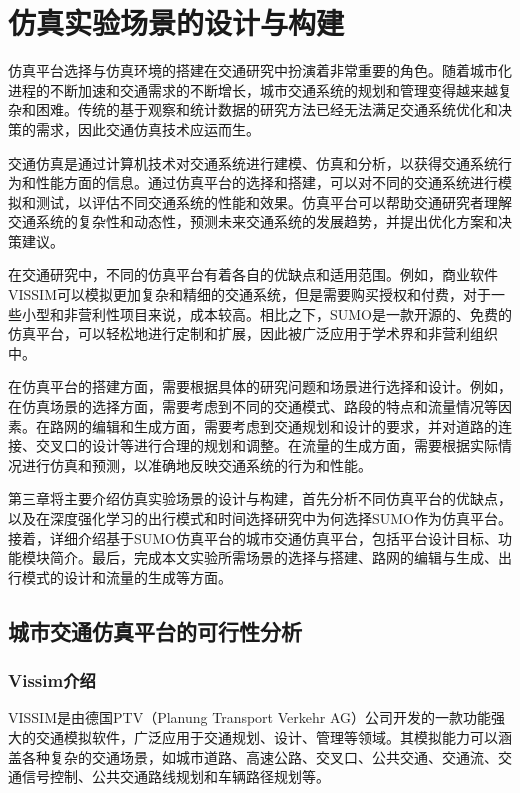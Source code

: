 \chapter{仿真实验场景的设计与构建}

仿真平台选择与仿真环境的搭建在交通研究中扮演着非常重要的角色。随着城市化进程的不断加速和交通需求的不断增长，城市交通系统的规划和管理变得越来越复杂和困难。传统的基于观察和统计数据的研究方法已经无法满足交通系统优化和决策的需求，因此交通仿真技术应运而生。

交通仿真是通过计算机技术对交通系统进行建模、仿真和分析，以获得交通系统行为和性能方面的信息。通过仿真平台的选择和搭建，可以对不同的交通系统进行模拟和测试，以评估不同交通系统的性能和效果。仿真平台可以帮助交通研究者理解交通系统的复杂性和动态性，预测未来交通系统的发展趋势，并提出优化方案和决策建议。

在交通研究中，不同的仿真平台有着各自的优缺点和适用范围。例如，商业软件VISSIM可以模拟更加复杂和精细的交通系统，但是需要购买授权和付费，对于一些小型和非营利性项目来说，成本较高。相比之下，SUMO是一款开源的、免费的仿真平台，可以轻松地进行定制和扩展，因此被广泛应用于学术界和非营利组织中。

在仿真平台的搭建方面，需要根据具体的研究问题和场景进行选择和设计。例如，在仿真场景的选择方面，需要考虑到不同的交通模式、路段的特点和流量情况等因素。在路网的编辑和生成方面，需要考虑到交通规划和设计的要求，并对道路的连接、交叉口的设计等进行合理的规划和调整。在流量的生成方面，需要根据实际情况进行仿真和预测，以准确地反映交通系统的行为和性能。

第三章将主要介绍仿真实验场景的设计与构建，首先分析不同仿真平台的优缺点，以及在深度强化学习的出行模式和时间选择研究中为何选择SUMO作为仿真平台。接着，详细介绍基于SUMO仿真平台的城市交通仿真平台，包括平台设计目标、功能模块简介。最后，完成本文实验所需场景的选择与搭建、路网的编辑与生成、出行模式的设计和流量的生成等方面。

\section{城市交通仿真平台的可行性分析}
\label{section:3.1}

\subsection{Vissim介绍}

VISSIM是由德国PTV（Planung Transport Verkehr AG）公司开发的一款功能强大的交通模拟软件，广泛应用于交通规划、设计、管理等领域。其模拟能力可以涵盖各种复杂的交通场景，如城市道路、高速公路、交叉口、公共交通、交通流、交通信号控制、公共交通路线规划和车辆路径规划等。

